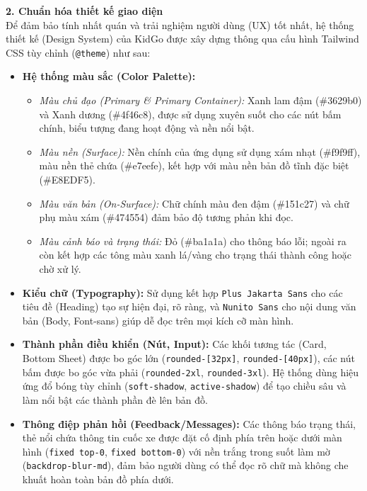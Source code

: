 \documentclass[../DoAn.tex]{subfiles}
\begin{document}
\textbf{2. Chuẩn hóa thiết kế giao diện} \\
Để đảm bảo tính nhất quán và trải nghiệm người dùng (UX) tốt nhất, hệ thống thiết kế (Design System) của KidGo được xây dựng thông qua cấu hình Tailwind CSS tùy chỉnh (\texttt{@theme}) như sau:
\begin{itemize}
    \item \textbf{Hệ thống màu sắc (Color Palette):}
          \begin{itemize}
              \item \textit{Màu chủ đạo (Primary \& Primary Container):} Xanh lam đậm (\#3629b0) và Xanh dương (\#4f46c8), được sử dụng xuyên suốt cho các nút bấm chính, biểu tượng đang hoạt động và nền nổi bật.
              \item \textit{Màu nền (Surface):} Nền chính của ứng dụng sử dụng xám nhạt (\#f9f9ff), màu nền thẻ chứa (\#e7eefe), kết hợp với màu nền bản đồ tĩnh đặc biệt (\#E8EDF5).
              \item \textit{Màu văn bản (On-Surface):} Chữ chính màu đen đậm (\#151c27) và chữ phụ màu xám (\#474554) đảm bảo độ tương phản khi đọc.
              \item \textit{Màu cảnh báo và trạng thái:} Đỏ (\#ba1a1a) cho thông báo lỗi; ngoài ra còn kết hợp các tông màu xanh lá/vàng cho trạng thái thành công hoặc chờ xử lý.
          \end{itemize}
    \item \textbf{Kiểu chữ (Typography):} Sử dụng kết hợp \texttt{Plus Jakarta Sans} cho các tiêu đề (Heading) tạo sự hiện đại, rõ ràng, và \texttt{Nunito Sans} cho nội dung văn bản (Body, Font-sans) giúp dễ đọc trên mọi kích cỡ màn hình.
    \item \textbf{Thành phần điều khiển (Nút, Input):} Các khối tương tác (Card, Bottom Sheet) được bo góc lớn (\texttt{rounded-[32px]}, \texttt{rounded-[40px]}), các nút bấm được bo góc vừa phải (\texttt{rounded-2xl}, \texttt{rounded-3xl}). Hệ thống dùng hiệu ứng đổ bóng tùy chỉnh (\texttt{soft-shadow}, \texttt{active-shadow}) để tạo chiều sâu và làm nổi bật các thành phần đè lên bản đồ.
    \item \textbf{Thông điệp phản hồi (Feedback/Messages):} Các thông báo trạng thái, thẻ nổi chứa thông tin cuốc xe được đặt cố định phía trên hoặc dưới màn hình (\texttt{fixed top-0}, \texttt{fixed bottom-0}) với nền trắng trong suốt làm mờ (\texttt{backdrop-blur-md}), đảm bảo người dùng có thể đọc rõ chữ mà không che khuất hoàn toàn bản đồ phía dưới.
\end{itemize}
\end{document}

